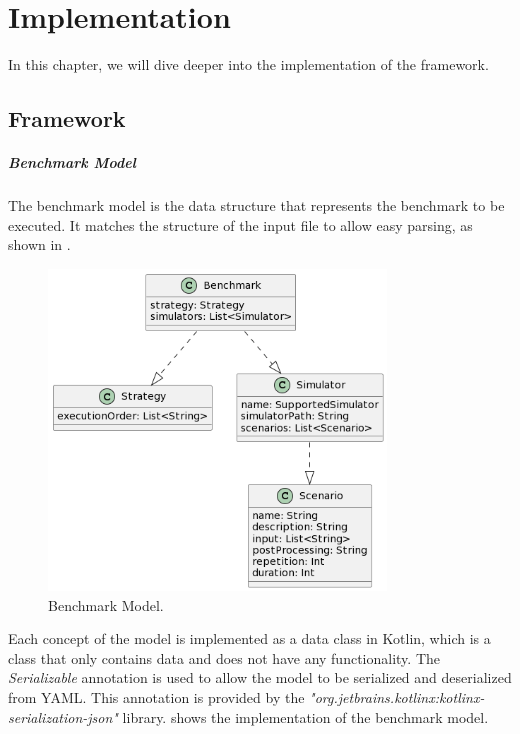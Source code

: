 \documentclass[12pt,a4paper,openright,twoside]{book}
\begin{document}
\chapter{Implementation}
\label{ch:implementation}

In this chapter, we will dive deeper into the implementation of the framework.

\section{Framework}

\paragraph*{Benchmark Model}
The benchmark model is the data structure that represents the benchmark to be executed.
It matches the structure of the input file to allow easy parsing, as shown in .

\begin{figure}[h!]
  \centering
  \includegraphics[width=0.8\textwidth]{figures/benchmark-model.png}
  \caption{Benchmark Model.}
  \label{fig:benchmark-model}
\end{figure}

Each concept of the model is implemented as a data class in Kotlin, which is a class that only contains data and does not have any functionality.
The \emph{Serializable} annotation is used to allow the model to be serialized and deserialized from YAML.
This annotation is provided by the \emph{"org.jetbrains.kotlinx:kotlinx-serialization-json"} library.
 shows the implementation of the benchmark model.
\end{document}
